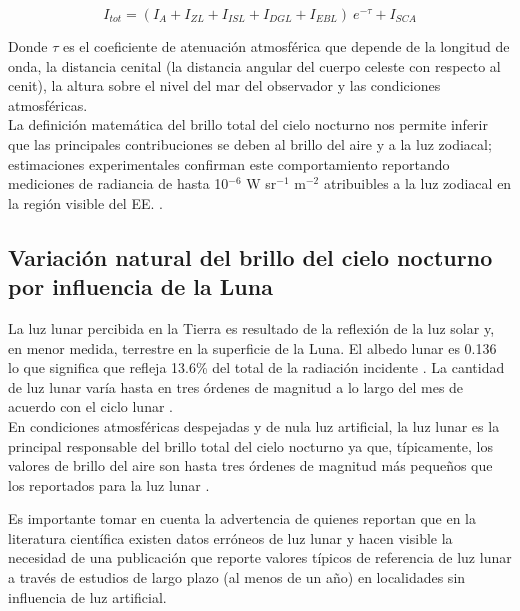 \begin{equation}
I_{tot} = (I_A + I_{ZL} + I_{ISL} + I_{DGL} + I_{EBL})\:e^{-\tau} + I_{SCA}
\end{equation}

\vspace{2mm} 

Donde $\tau$ es el coeficiente de atenuación atmosférica que depende de la longitud de onda, la distancia cenital (la distancia angular del cuerpo celeste con respecto al cenit), la altura sobre el nivel del mar del observador y las condiciones atmosféricas.\\ 

La definición matemática del brillo total del cielo nocturno nos permite inferir que las principales contribuciones se deben al brillo del aire y a la luz zodiacal; estimaciones experimentales confirman este comportamiento reportando mediciones de radiancia de hasta 10$^{-6}$ W sr$^{-1}$  m$^{-2}$ atribuibles a la luz zodiacal en la región visible del EE. \citep{Leinert1998}.\\ 

\subsection{Variación natural del brillo del cielo nocturno por influencia de la Luna}

La luz lunar percibida en la Tierra es resultado de la reflexión de la luz solar y, en menor medida, terrestre en la superficie de la Luna. El albedo lunar es 0.136 lo que significa que refleja 13.6\% del total de la radiación incidente \citep{Matthews2008}. La cantidad de luz lunar varía hasta en tres órdenes de magnitud a lo largo del mes de acuerdo con el ciclo lunar \citep{Kyba2017}.\\

En condiciones atmosféricas despejadas y de nula luz artificial, la luz lunar es la principal responsable del brillo total del cielo nocturno ya que, típicamente, los valores de brillo del aire son hasta tres órdenes de magnitud más pequeños que los reportados para la luz lunar \citep{Hanel2018}.\\

\newpage

Es importante tomar en cuenta la advertencia de \cite{Kyba2017} quienes reportan que en la literatura científica existen datos erróneos de luz lunar y hacen visible la necesidad de una publicación que reporte valores típicos de referencia de luz lunar a través de estudios de largo plazo (al menos de un año) en localidades sin influencia de luz artificial.\\ 

